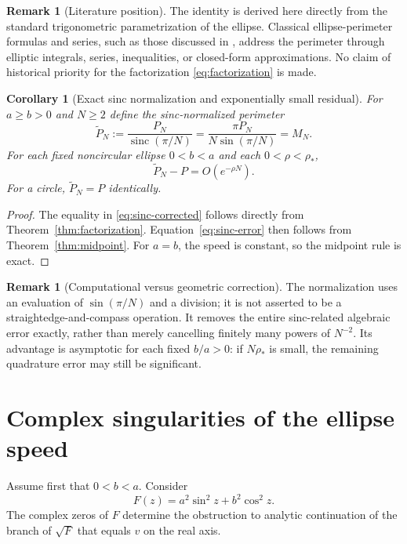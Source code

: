 \documentclass[11pt]{article}
\newtheorem{corollary}[theorem]{Corollary}
\theoremstyle{definition}
\newtheorem{remark}[theorem]{Remark}
\newcommand{\sinc}{\operatorname{sinc}}
\numberwithin{equation}{section}
\begin{document}
\begin{remark}[Literature position]
The identity is derived here directly from the standard trigonometric
parametrization of the ellipse.  Classical ellipse-perimeter formulas
and series, such as those discussed in
\citep{Ivory1798,Villarino2006}, address the perimeter through elliptic
integrals, series, inequalities, or closed-form approximations.  No
claim of historical priority for the factorization
\eqref{eq:factorization} is made.
\end{remark}

\begin{corollary}[Exact sinc normalization and exponentially small residual]
\label{cor:sinc}
For $a\ge b>0$ and $N\ge2$ define the sinc-normalized perimeter
\begin{equation}\label{eq:sinc-corrected}
\boxed{\widetilde P_N:=\frac{P_N}{\sinc(\pi/N)}
=\frac{\pi P_N}{N\sin(\pi/N)}=M_N.}
\end{equation}
For each fixed noncircular ellipse $0<b<a$ and each
$0<\rho<\rho_*$,
\begin{equation}\label{eq:sinc-error}
\widetilde P_N-P=O(e^{-\rho N}).
\end{equation}
For a circle, $\widetilde P_N=P$ identically.
\end{corollary}
\begin{proof}
The equality in \eqref{eq:sinc-corrected} follows directly from
Theorem~\ref{thm:factorization}. Equation~\eqref{eq:sinc-error}
then follows from Theorem~\ref{thm:midpoint}. For $a=b$, the speed
is constant, so the midpoint rule is exact.
\end{proof}
\begin{remark}[Computational versus geometric correction]
The normalization uses an evaluation of $\sin(\pi/N)$ and a division;
it is not asserted to be a straightedge-and-compass operation. It
removes the entire sinc-related algebraic error exactly, rather than
merely cancelling finitely many powers of $N^{-2}$. Its advantage is
asymptotic for each fixed $b/a>0$: if $N\rho_*$ is small, the remaining
quadrature error may still be significant.
\end{remark}

\section{Complex singularities of the ellipse speed}

Assume first that \(0<b<a\).  Consider
\[
F(z)=a^2\sin^2z+b^2\cos^2z.
\]
The complex zeros of \(F\) determine the obstruction to analytic
continuation of the branch of \(\sqrt{F}\) that equals \(v\) on the
real axis.
\end{document}
